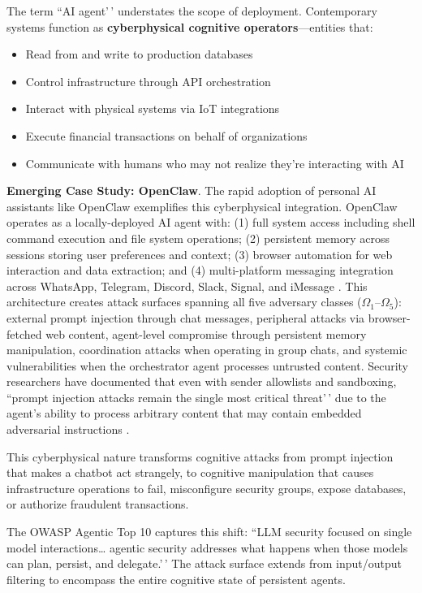 \documentclass[
]{article}
\begin{document}
The term ``AI agent'\,' understates the scope of deployment.
Contemporary systems function as
\textbf{cyberphysical cognitive operators}---entities that:

\begin{itemize}
\item Read from and write to production databases
\item Control infrastructure through API orchestration
\item Interact with physical systems via IoT integrations
\item Execute financial transactions on behalf of organizations
\item Communicate with humans who may not realize they're interacting with AI
\end{itemize}

\textbf{Emerging Case Study: OpenClaw}. The rapid adoption of personal
AI assistants like OpenClaw \cite{openclaw2026} exemplifies this
cyberphysical integration. OpenClaw operates as a locally-deployed AI
agent with: (1) full system access including shell command execution and
file system operations; (2) persistent memory across sessions storing
user preferences and context; (3) browser automation for web interaction
and data extraction; and (4) multi-platform messaging integration across
WhatsApp, Telegram, Discord, Slack, Signal, and iMessage
\cite{openclaw2026security}. This architecture creates attack surfaces
spanning all five adversary classes (\(\Omega_1\)--\(\Omega_5\)):
external prompt injection through chat messages, peripheral attacks via
browser-fetched web content, agent-level compromise through persistent
memory manipulation, coordination attacks when operating in group chats,
and systemic vulnerabilities when the orchestrator agent processes
untrusted content. Security researchers have documented that even with
sender allowlists and sandboxing, ``prompt injection attacks remain the
single most critical threat'\,' due to the agent's ability to process
arbitrary content that may contain embedded adversarial instructions
\cite{openclaw2026security, echoleak2025}.

This cyberphysical nature transforms cognitive attacks from prompt
injection that makes a chatbot act strangely, to cognitive manipulation
that causes infrastructure operations to fail, misconfigure security
groups, expose databases, or authorize fraudulent transactions.

The OWASP Agentic Top 10 \cite{owasp2025agentic} captures this shift:
``LLM security focused on single model interactions\ldots{} agentic
security addresses what happens when those models can plan, persist, and
delegate.'\,' The attack surface extends from input/output filtering to
encompass the entire cognitive state of persistent agents.
\end{document}
